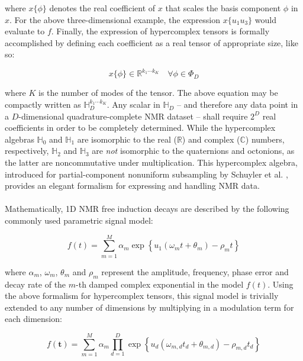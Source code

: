 \begin{doublespace}
where $x\{\phi\}$ denotes the real coefficient of $x$ that scales the basis
component $\phi$ in $x$. For the above three-dimensional example, the
expression $x\{u_1 u_3\}$ would evaluate to $f$. Finally, the expression of
hypercomplex tensors is formally accomplished by defining each coefficient
as a real tensor of appropriate size, like so:

\begin{equation}
x \{ \phi \} \in \mathbb{R}^{k_1 \cdots k_K} \quad \forall \phi \in \Phi_D
\end{equation}

where $K$ is the number of modes of the tensor. The above equation may be
compactly written as $\mathbb{H}_D^{k_1 \cdots k_K}$. Any scalar
in $\mathbb{H}_D$ -- and therefore any data point in a $D$-dimensional
quadrature-complete NMR dataset -- shall require $2^D$ real coefficients
in order to be completely determined. While the hypercomplex
algebras $\mathbb{H}_0$ and $\mathbb{H}_1$ are isomorphic to the real 
($\mathbb{R}$) and complex ($\mathbb{C}$) numbers, respectively, $\mathbb{H}_2$
and $\mathbb{H}_3$ are {\it not} isomorphic to the quaternions and octonions,
as the latter are noncommutative under multiplication. This hypercomplex
algebra, introduced for partial-component nonuniform subsampling by Schuyler
et al. \cite{schuyler:jmr2013}, provides an elegant formalism for expressing
and handling NMR data.
\\\\
Mathematically, 1D NMR free induction decays are described by the following
commonly used parametric signal model:

\begin{equation}
f(t) = \sum_{m=1}^M \alpha_m \exp\left\{
  u_1 (\omega_m t + \theta_m) - \rho_m t
  \right\}
\end{equation}

where $\alpha_m$, $\omega_m$, $\theta_m$ and $\rho_m$ represent the amplitude,
frequency, phase error and decay rate of the $m$-th damped complex exponential
in the model $f(t)$. Using the above formalism for hypercomplex tensors, this
signal model is trivially extended to any number of dimensions by multiplying
in a modulation term for each dimension:

\begin{equation}
f(\mathbf{t}) = \sum_{m=1}^M \alpha_m \prod_{d=1}^D \exp\left\{
  u_d (\omega_{m,d} t_d + \theta_{m,d}) - \rho_{m,d} t_d
  \right\}
\end{equation}


\end{doublespace}
